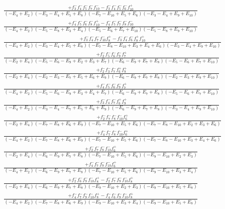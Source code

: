 \documentclass{article}
\begin{document}
\[\begin{array}{rcl}
\frac{+f_{3}^{-}f_{4}^{-}f_{5}^{-}f_{7}^{-}f_{10}^{-}-f_{3}^{-}f_{4}^{-}f_{5}^{-}f_{6}^{-}f_{10}^{+}}{(-E_{4}+E_{2})(-E_{3}-E_{4}+E_{5}+E_{8})(-E_{7}-E_{10}+E_{5}+E_{6})(-E_{3}-E_{4}+E_{9}+E_{10})}\\
\frac{+f_{4}^{-}f_{5}^{-}f_{6}^{-}f_{8}^{-}f_{10}^{+}-f_{4}^{-}f_{5}^{-}f_{7}^{-}f_{8}^{-}f_{10}^{-}}{(-E_{4}+E_{2})(-E_{5}-E_{8}+E_{3}+E_{4})(-E_{5}-E_{6}+E_{7}+E_{10})(-E_{5}-E_{8}+E_{9}+E_{10})}\\
\frac{+f_{3}^{-}f_{4}^{-}f_{7}^{-}f_{10}^{-}f_{8}^{+}-f_{3}^{-}f_{4}^{-}f_{6}^{-}f_{8}^{+}f_{10}^{+}}{(-E_{4}+E_{2})(-E_{3}-E_{4}+E_{5}+E_{8})(-E_{7}-E_{8}-E_{10}+E_{3}+E_{4}+E_{6})(-E_{3}-E_{4}+E_{9}+E_{10})}\\
\frac{+f_{2}^{-}f_{5}^{-}f_{6}^{-}f_{9}^{-}f_{7}^{+}}{(-E_{2}+E_{4})(-E_{5}-E_{6}-E_{9}+E_{2}+E_{3}+E_{7})(-E_{6}-E_{9}+E_{7}+E_{8})(-E_{5}-E_{6}+E_{7}+E_{10})}\\
\frac{+f_{2}^{-}f_{3}^{-}f_{7}^{-}f_{6}^{+}f_{9}^{+}}{(-E_{2}+E_{4})(-E_{2}-E_{3}-E_{7}+E_{5}+E_{6}+E_{9})(-E_{6}-E_{9}+E_{7}+E_{8})(-E_{2}-E_{3}+E_{9}+E_{10})}\\
\frac{+f_{4}^{-}f_{5}^{-}f_{6}^{-}f_{9}^{-}f_{7}^{+}}{(-E_{4}+E_{2})(-E_{5}-E_{6}-E_{9}+E_{3}+E_{4}+E_{7})(-E_{6}-E_{9}+E_{7}+E_{8})(-E_{5}-E_{6}+E_{7}+E_{10})}\\
\frac{+f_{3}^{-}f_{4}^{-}f_{7}^{-}f_{6}^{+}f_{9}^{+}}{(-E_{4}+E_{2})(-E_{3}-E_{4}-E_{7}+E_{5}+E_{6}+E_{9})(-E_{6}-E_{9}+E_{7}+E_{8})(-E_{3}-E_{4}+E_{9}+E_{10})}\\
\frac{+f_{2}^{-}f_{7}^{-}f_{8}^{-}f_{10}^{-}f_{6}^{+}}{(-E_{2}+E_{4})(-E_{7}-E_{8}+E_{6}+E_{9})(-E_{7}-E_{10}+E_{5}+E_{6})(-E_{7}-E_{8}-E_{10}+E_{2}+E_{3}+E_{6})}\\
\frac{+f_{4}^{-}f_{7}^{-}f_{8}^{-}f_{10}^{-}f_{6}^{+}}{(-E_{4}+E_{2})(-E_{7}-E_{8}+E_{6}+E_{9})(-E_{7}-E_{10}+E_{5}+E_{6})(-E_{7}-E_{8}-E_{10}+E_{3}+E_{4}+E_{6})}\\
\frac{+f_{2}^{-}f_{7}^{-}f_{9}^{-}f_{10}^{-}f_{6}^{+}}{(-E_{2}+E_{4})(-E_{6}-E_{9}+E_{7}+E_{8})(-E_{7}-E_{10}+E_{5}+E_{6})(-E_{9}-E_{10}+E_{2}+E_{3})}\\
\frac{+f_{4}^{-}f_{7}^{-}f_{9}^{-}f_{10}^{-}f_{6}^{+}}{(-E_{4}+E_{2})(-E_{6}-E_{9}+E_{7}+E_{8})(-E_{7}-E_{10}+E_{5}+E_{6})(-E_{9}-E_{10}+E_{3}+E_{4})}\\
\frac{+f_{2}^{-}f_{6}^{-}f_{9}^{-}f_{10}^{-}f_{8}^{+}-f_{2}^{-}f_{7}^{-}f_{9}^{-}f_{10}^{-}f_{8}^{+}}{(-E_{2}+E_{4})(-E_{6}-E_{9}+E_{7}+E_{8})(-E_{9}-E_{10}+E_{2}+E_{3})(-E_{9}-E_{10}+E_{5}+E_{8})}\\
\frac{+f_{4}^{-}f_{7}^{-}f_{9}^{-}f_{10}^{-}f_{8}^{+}-f_{4}^{-}f_{6}^{-}f_{9}^{-}f_{10}^{-}f_{8}^{+}}{(-E_{4}+E_{2})(-E_{7}-E_{8}+E_{6}+E_{9})(-E_{9}-E_{10}+E_{3}+E_{4})(-E_{9}-E_{10}+E_{5}+E_{8})}\\

\end{array}\]
\end{document}
